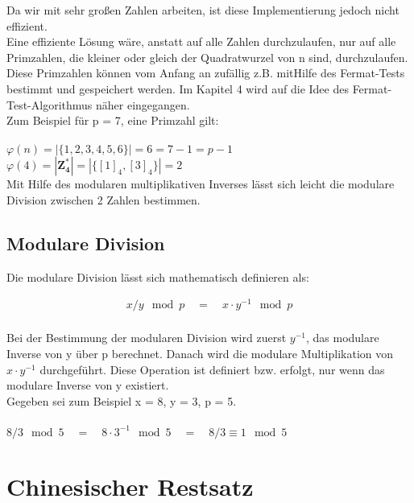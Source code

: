 Da wir mit sehr großen Zahlen arbeiten, ist diese Implementierung jedoch nicht effizient. \\
Eine effiziente Lösung wäre, anstatt auf alle Zahlen durchzulaufen, nur auf alle  Primzahlen, die kleiner oder gleich der Quadratwurzel von n sind, durchzulaufen. Diese Primzahlen können vom Anfang an zufällig z.B. mitHilfe des Fermat-Tests bestimmt und gespeichert werden. Im Kapitel 4 wird auf die Idee des Fermat-Test-Algorithmus näher eingegangen. \\

Zum Beispiel für p = 7, eine Primzahl gilt: \\
\\
  \(\varphi(n) = |\{ 1, 2, 3, 4, 5, 6 \}| = 6 = 7 - 1 = p - 1\) \\

\(\varphi(4) = |\mathbf{Z^*_4}| = |\{ [1]_4, [3]_4 \}| = 2\) \\


Mit Hilfe des modularen multiplikativen Inverses lässt sich leicht die modulare Division zwischen 2 Zahlen bestimmen.


\subsection{Modulare Division}

Die modulare Division lässt sich mathematisch definieren als:
\begin{ceqn}
\begin{align*}
    x/y \mod p \quad = \quad x \cdot y^{-1} \mod p \\
\end{align*}
\end{ceqn}

Bei der Bestimmung der modularen Division wird zuerst $ y^{-1}$, das modulare Inverse von y über p berechnet. Danach wird die modulare Multiplikation von $ x \cdot y^{-1} $ durchgeführt. Diese Operation ist definiert bzw. erfolgt, nur wenn das modulare Inverse von y existiert. 
\\
Gegeben sei zum Beispiel x = 8, y = 3, p = 5. \\
\\
\( 8/3 \mod 5 \quad = \quad 8 \cdot 3^{-1} \mod 5 \quad = \quad 8/3 \equiv 1 \mod 5 \)


\section{Chinesischer Restsatz}

